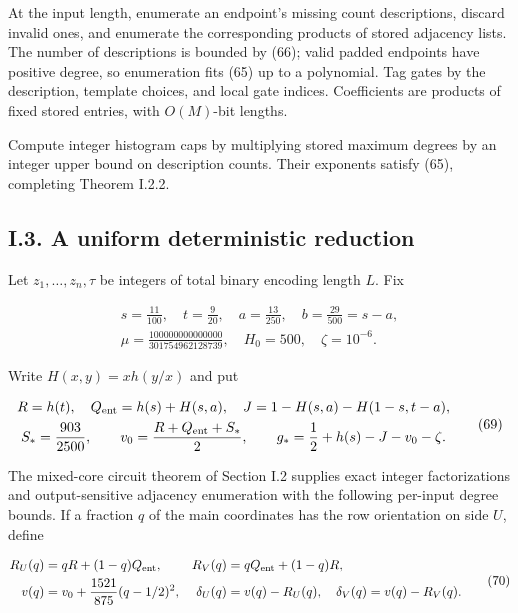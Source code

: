 At the input length, enumerate an endpoint's missing count descriptions, discard invalid ones, and enumerate the corresponding products of stored adjacency lists. The number of descriptions is bounded by (66); valid padded endpoints have positive degree, so enumeration fits (65) up to a polynomial. Tag gates by the description, template choices, and local gate indices. Coefficients are products of fixed stored entries, with \(O(M)\)-bit lengths.

Compute integer histogram caps by multiplying stored maximum degrees by an integer upper bound on description counts. Their exponents satisfy (65), completing Theorem I.2.2.

\hypertarget{af-a9ec399514-i.3.-a-uniform-deterministic-reduction}{%
\subsection{I.3. A uniform deterministic reduction}\label{af-a9ec399514-i.3.-a-uniform-deterministic-reduction}}

Let \(z_1,\ldots,z_n,\tau\) be integers of total binary encoding length \(L\). Fix

\[
\begin{gathered}
s=\frac{11}{100},\quad t=\frac9{20},\quad
a=\frac{13}{250},\quad b=\frac{29}{500}=s-a,\\
\mu=\frac{100000000000000}{301754962128739},\quad
H_0=500,\quad\zeta=10^{-6}.
\end{gathered}
\tag{68}
\]

Write \(H(x,y)=xh(y/x)\) and put

\[
\begin{gathered}
R=h(t),\quad Q_{\rm ent}=h(s)+H(s,a),\quad
J=1-H(s,a)-H(1-s,t-a),\\
S_*=\frac{903}{2500},\qquad
v_0=\frac{R+Q_{\rm ent}+S_*}{2},\qquad
g_*=\frac12+h(s)-J-v_0-\zeta.
\end{gathered}
\tag{69}
\]

The mixed-core circuit theorem of Section I.2 supplies exact integer factorizations and output-sensitive adjacency enumeration with the following per-input degree bounds. If a fraction \(q\) of the main coordinates has the row orientation on side \(U\), define

\[
\begin{aligned}
R_U(q)&=qR+(1-q)Q_{\rm ent},&
R_V(q)&=qQ_{\rm ent}+(1-q)R,\\
v(q)&=v_0+\frac{1521}{875}(q-1/2)^2,&
\delta_U(q)&=v(q)-R_U(q),\quad
\delta_V(q)=v(q)-R_V(q).
\end{aligned}
\tag{70}
\]

